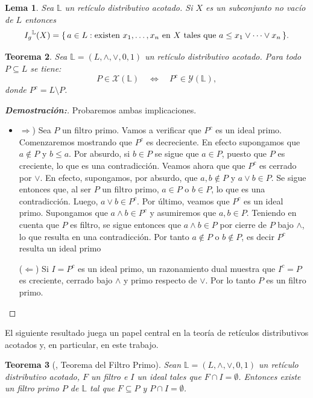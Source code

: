 \documentclass[12pt]{book}
\newtheorem{theorem}{Teorema}[section]
\newtheorem{lemma}[theorem]{Lema}
\newcommand{\Ig}{\mathnormal{I_g}}
\begin{document}
\begin{lemma}\label{lem:ideal_generado}Sea \( \mathbb{L} \) un retículo distributivo acotado. Si \( X \) es un subconjunto no vacío de \( L \) entonces
\[
\Ig^{\mathbb{L}}(X)
   = \{\, a \in L :
        \text{existen } x_{1},\dots,x_{n}\text{ en }X
        \text{ tales que } a \le x_{1}\vee\dots\vee x_{n} \,\}.
\]
\end{lemma}

\begin{theorem}\label{thm:complemento-primo}
Sea $\mathbb L=(L,\wedge,\vee,0,1)$ un retículo distributivo acotado.  
Para todo $P\subseteq L$ se tiene:
\[
P\in\mathcal{X}(\mathbb{L})
\quad\Longleftrightarrow\quad
P^{c}\in \mathcal{Y}(\mathbb{L}),
\]
donde $P^{c}=L\setminus P$.
\end{theorem}

\begin{proof}[{\textbf{Demostración:}}]
Probaremos ambas implicaciones.
\begin{itemize}
\item $\Rightarrow$) Sea $P$ un filtro primo. Vamos a verificar que $P^{c}$ es un ideal primo. Comenzaremos mostrando que $P^{c}$ es decreciente. En efecto supongamos que $a\notin P$ y $b\le a$. Por absurdo, si $b\in P$ se sigue que $a\in P$, puesto que $P$ es creciente, lo que es una contradicción. Veamos ahora que que $P^{c}$ es cerrado por $\vee$. En efecto, supongamos, por absurdo, que $a,b\notin P$ y $a\vee b \in P$. Se sigue entonces que, al ser $P$ un filtro primo, $a\in P$ o $b\in P$, lo que es una contradicción. Luego, $a \vee b \in P^{c}$. Por último, veamos que $P^{c}$ es un ideal primo. Supongamos que $a\wedge b\in P^{c}$ y asumiremos que $a,b\in P$. Teniendo en cuenta que $P$ es filtro, se sigue entonces que $a\wedge b\in P$ por cierre de $P$ bajo $\wedge$, lo que resulta en una contradicción. Por tanto $a\notin P$ o $b\notin P$, es decir $P^{c}$ resulta un ideal primo

\smallskip
($\Leftarrow$)  
Si $I=P^{c}$ es un ideal primo, un razonamiento dual muestra que  
$I^{c}=P$ es creciente, cerrado bajo $\wedge$ y primo respecto de $\vee$.  
Por lo tanto $P$ es un filtro primo.
\end{itemize} 
\end{proof}

El siguiente resultado juega un papel central en la teoría de retículos distributivos acotados y, en particular, en este trabajo.

\begin{theorem}[{\cite[Teorema~2.4.13]{SS}}, Teorema del Filtro Primo] \label{thm:filtro_primo}
Sean \( \mathbb{L}=(L,\wedge,\vee,0,1) \) un retículo distributivo acotado, \( F \) un filtro e \( I \) un ideal tales que \( F\cap I=\emptyset \). Entonces existe un filtro primo \( P \) de \( \mathbb{L} \)
tal que \( F \subseteq P \) y \( P \cap I=\emptyset \).
\end{theorem}
\end{document}
